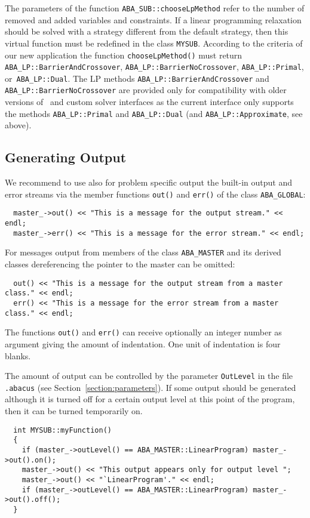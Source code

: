 The parameters of the function {\tt ABA\_SUB::chooseLpMethod} refer to the
number of removed and added variables and constraints.
If a linear programming relaxation should be solved with a strategy different
from the default strategy, then this virtual function must be
redefined in the class {\tt MYSUB}. According to the criteria of our new
application the function {\tt chooseLpMethod()} must return
{\tt ABA\_LP::BarrierAndCrossover}, {\tt ABA\_LP::BarrierNoCrossover}, 
{\tt ABA\_LP::Primal},
or~{\tt ABA\_LP::Dual}.
The LP methods {\tt ABA\_LP::BarrierAndCrossover} and
{\tt ABA\_LP::BarrierNoCrossover} are provided only for compatibility with
older versions of \ABACUS\ and custom solver interfaces as the current interface
only supports the methods {\tt ABA\_LP::Primal} and {\tt ABA\_LP::Dual} (and
{\tt ABA\_LP::Approximate}, see above).

\subsection{Generating Output}
\noindent
We recommend to use also for problem specific output the built-in output
and error streams via the member functions 
{\tt out()} 
and {\tt err()}
of the class {\tt ABA\_GLOBAL}:
\begin{verbatim}
  master_->out() << "This is a message for the output stream." << endl;
  master_->err() << "This is a message for the error stream." << endl;
\end{verbatim}
For messages output from members of the class {\tt ABA\_MASTER} and its derived
classes dereferencing the pointer to the master can be omitted:
\begin{verbatim}
  out() << "This is a message for the output stream from a master class." << endl;
  err() << "This is a message for the error stream from a master class." << endl;
\end{verbatim}
The functions {\tt out()} and {\tt err()} can receive optionally an integer
number as argument giving the amount of indentation. One unit of indentation
is four blanks.

The amount of output can be controlled by the parameter {\tt OutLevel} in
the file {\tt .abacus} (see Section~\ref{section:parameters}). 
If some output should be generated although it is
turned off for a certain output level at this point of the program, then
it can be turned temporarily on.
\begin{verbatim}
  int MYSUB::myFunction()
  {
    if (master_->outLevel() == ABA_MASTER::LinearProgram) master_->out().on();
    master_->out() << "This output appears only for output level ";
    master_->out() << "`LinearProgram'." << endl;
    if (master_->outLevel() == ABA_MASTER::LinearProgram) master_->out().off();
  }
\end{verbatim}

